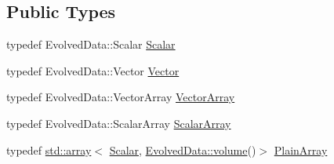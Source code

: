 \subsection*{Public Types}
\begin{DoxyCompactItemize}
\item 
typedef Evolved\+Data\+::\+Scalar \mbox{\hyperlink{classregu_system_3_01_newtonian_3_01typename_01_evolved_data_1_1_scalar_01_4_00_01_evolved_data_00_01_regularitor_01_4_a6993f135075541f441a7642845b183a5}{Scalar}}
\item 
typedef Evolved\+Data\+::\+Vector \mbox{\hyperlink{classregu_system_3_01_newtonian_3_01typename_01_evolved_data_1_1_scalar_01_4_00_01_evolved_data_00_01_regularitor_01_4_a21c05c4ff0b6317622c03f389ccefa85}{Vector}}
\item 
typedef Evolved\+Data\+::\+Vector\+Array \mbox{\hyperlink{classregu_system_3_01_newtonian_3_01typename_01_evolved_data_1_1_scalar_01_4_00_01_evolved_data_00_01_regularitor_01_4_a3b84b504bd689b0a0f6543e885772a8d}{Vector\+Array}}
\item 
typedef Evolved\+Data\+::\+Scalar\+Array \mbox{\hyperlink{classregu_system_3_01_newtonian_3_01typename_01_evolved_data_1_1_scalar_01_4_00_01_evolved_data_00_01_regularitor_01_4_a07a1e7c26da06051d8184993828ede8c}{Scalar\+Array}}
\item 
typedef \mbox{\hyperlink{classparticle_system_a1817956f802188c82c12c223c32bd28a}{std\+::array}}$<$ \mbox{\hyperlink{classregu_system_3_01_newtonian_3_01typename_01_evolved_data_1_1_scalar_01_4_00_01_evolved_data_00_01_regularitor_01_4_a6993f135075541f441a7642845b183a5}{Scalar}}, \mbox{\hyperlink{classregu_system_a4260b237d36d137b01504c0effd385fa}{Evolved\+Data\+::volume}}()$>$ \mbox{\hyperlink{classregu_system_3_01_newtonian_3_01typename_01_evolved_data_1_1_scalar_01_4_00_01_evolved_data_00_01_regularitor_01_4_a26da8a1ed92e5aced3615da524ef37b3}{Plain\+Array}}
\end{DoxyCompactItemize}

